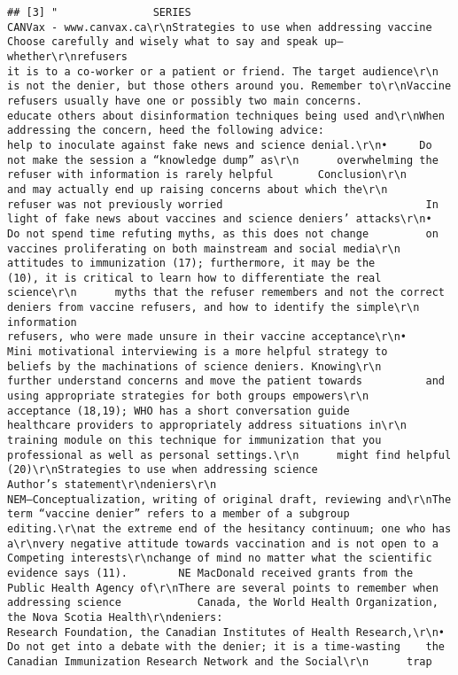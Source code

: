\documentclass[
]{book}
\begin{document}
\begin{verbatim}
## [3] "               SERIES                                                                                       CANVax - www.canvax.ca\r\nStrategies to use when addressing vaccine                               Choose carefully and wisely what to say and speak up—whether\r\nrefusers                                                                it is to a co-worker or a patient or friend. The target audience\r\n                                                                        is not the denier, but those others around you. Remember to\r\nVaccine refusers usually have one or possibly two main concerns.        educate others about disinformation techniques being used and\r\nWhen addressing the concern, heed the following advice:                 help to inoculate against fake news and science denial.\r\n•     Do not make the session a “knowledge dump” as\r\n      overwhelming the refuser with information is rarely helpful       Conclusion\r\n      and may actually end up raising concerns about which the\r\n      refuser was not previously worried                                In light of fake news about vaccines and science deniers’ attacks\r\n•     Do not spend time refuting myths, as this does not change         on vaccines proliferating on both mainstream and social media\r\n      attitudes to immunization (17); furthermore, it may be the        (10), it is critical to learn how to differentiate the real science\r\n      myths that the refuser remembers and not the correct              deniers from vaccine refusers, and how to identify the simple\r\n      information                                                       refusers, who were made unsure in their vaccine acceptance\r\n•     Mini motivational interviewing is a more helpful strategy to      beliefs by the machinations of science deniers. Knowing\r\n      further understand concerns and move the patient towards          and using appropriate strategies for both groups empowers\r\n      acceptance (18,19); WHO has a short conversation guide            healthcare providers to appropriately address situations in\r\n      training module on this technique for immunization that you       professional as well as personal settings.\r\n      might find helpful (20)\r\nStrategies to use when addressing science                               Author’s statement\r\ndeniers\r\n                                                                        NEM—Conceptualization, writing of original draft, reviewing and\r\nThe term “vaccine denier” refers to a member of a subgroup              editing.\r\nat the extreme end of the hesitancy continuum; one who has a\r\nvery negative attitude towards vaccination and is not open to a         Competing interests\r\nchange of mind no matter what the scientific evidence says (11).        NE MacDonald received grants from the Public Health Agency of\r\nThere are several points to remember when addressing science            Canada, the World Health Organization, the Nova Scotia Health\r\ndeniers:                                                                Research Foundation, the Canadian Institutes of Health Research,\r\n•     Do not get into a debate with the denier; it is a time-wasting    the Canadian Immunization Research Network and the Social\r\n      trap     
\end{verbatim}
\end{document}
